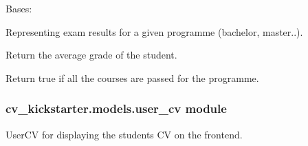 \documentclass[letterpaper,10pt,english]{sphinxmanual}
\begin{document}
\begin{fulllineitems}
\label{cv_kickstarter.models:cv_kickstarter.models.exam_result_programme.ExamResultProgramme}
Bases: 

Representing exam results for a given programme (bachelor, master..).

\begin{fulllineitems}
\label{cv_kickstarter.models:cv_kickstarter.models.exam_result_programme.ExamResultProgramme.average_grade}
Return the average grade of the student.

\end{fulllineitems}


\begin{fulllineitems}
\label{cv_kickstarter.models:cv_kickstarter.models.exam_result_programme.ExamResultProgramme.is_done}
Return true if all the courses are passed for the programme.

\end{fulllineitems}


\end{fulllineitems}



\subsubsection{cv\_kickstarter.models.user\_cv module}
\label{cv_kickstarter.models:module-cv_kickstarter.models.user_cv}\label{cv_kickstarter.models:cv-kickstarter-models-user-cv-module}
UserCV for displaying the students CV on the frontend.
\end{document}

